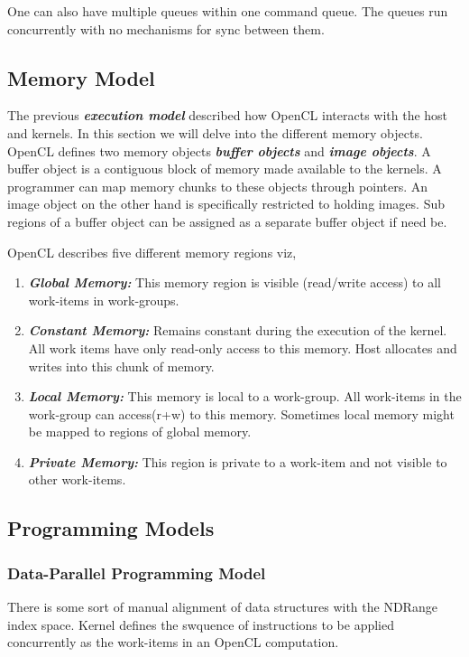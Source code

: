 \documentclass[10pt]{article}
\begin{document}
One can also have multiple queues within one command queue. The queues run concurrently with no mechanisms for sync between them.

\subsection{Memory Model}
The previous \textit{\textbf{execution model}} described how OpenCL interacts with the host and kernels. In this section we will delve into the different memory objects. OpenCL defines two memory objects \textit{\textbf{buffer objects}} and \textit{\textbf{image objects}}. A buffer object is a contiguous block of memory made available to the kernels. A programmer can map memory chunks to these objects through pointers. An image object on the other hand is specifically restricted to holding images. Sub regions of a buffer object can be assigned as a separate buffer object if need be. 

OpenCL describes five different memory regions viz,

\begin{enumerate}
	\item \textit{\textbf{Global Memory:}} This memory region is visible (read/write access) to all work-items in work-groups. 
	\item \textit{\textbf{Constant Memory:}} Remains constant during the execution of the kernel. All work items have only read-only access to this memory. Host allocates and writes into this chunk of memory.
	\item \textit{\textbf{Local Memory:}} This memory is local to a work-group. All work-items in the work-group can access(r+w) to this memory. Sometimes local memory might be mapped to regions of global memory.
	\item \textit{\textbf{Private Memory:}} This region is private to a work-item and not visible to other work-items.
\end{enumerate}


{\color{red} \date{18-Nov-2020}}
\subsection{Programming Models}
\subsubsection{Data-Parallel Programming Model}
There is some sort of manual alignment of data structures with the NDRange index space. Kernel defines the swquence of instructions to be applied concurrently as the work-items in an OpenCL computation.
\end{document}
